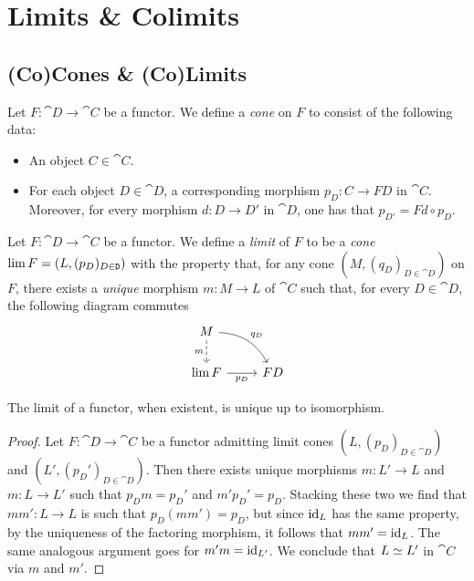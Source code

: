 \section{Limits \& Colimits}

\subsection{(Co)Cones \& (Co)Limits}

\begin{definition}[Cone]
    \label{def:cone-on-functor}
    Let \(F: \cat D \to \cat C\) be a functor. We define a \emph{cone} on \(F\) to
    consist of the following data:
    \begin{itemize}\setlength\itemsep{0em}
        \item An object \(C \in \cat C\).
        \item For each object \(D \in \cat D\), a corresponding morphism \(p_D: C \to F
              D\) in \(\cat C\). Moreover, for every morphism \(d: D \to D'\) in \(\cat D\),
              one has that \(p_{D'} = F d \circ p_D\).
    \end{itemize}
\end{definition}

\begin{definition}
    \label{def:limit-of-functor}
    Let \(F: \cat D \to \cat C\) be a functor. We define a \emph{limit} of \(F\) to
    be a \emph{cone} \(\operatorname{lim} F = (L, (p_{D})_{D \in \texttt D})\) with the property
    that, for any cone \((M, (q_D)_{D \in \cat D})\) on \(F\), there exists a
    \emph{unique} morphism \(m: M \to L\) of \(\cat C\) such that, for every
    \(D \in \cat D\), the following diagram commutes
    \[
        \begin{tikzcd}
            M \ar[d, dashed, "m"'] \ar[rd, bend left, "q_D"] & \\
            \Lim F \ar[r, "p_D"'] &F D
        \end{tikzcd}
    \]
\end{definition}

\begin{proposition}[Uniqueness]
    \label{prop:limit-functor-uniqueness}
    The limit of a functor, when existent, is unique up to isomorphism.
\end{proposition}

\begin{proof}
    Let \(F: \cat D \to \cat C\) be a functor admitting limit cones
    \((L, (p_D)_{D \in \cat D})\) and \((L', (p_D')_{D \in \cat D})\). Then there
    exists unique morphisms \(m: L' \to L\) and \(m: L \to L'\) such that
    \(p_D m = p_D'\) and \(m' p_D' = p_D\). Stacking these two we find that
    \(m m': L \to L\) is such that \(p_D (m m') = p_D\), but since \(\operatorname{id}_L\) has the
    same property, by the uniqueness of the factoring morphism, it follows that
    \(m m' = \operatorname{id}_L\). The same analogous argument goes for \(m' m = \operatorname{id}_{L'}\). We
    conclude that \(L \simeq L'\) in \(\cat C\) via \(m\) and \(m'\).
\end{proof}

